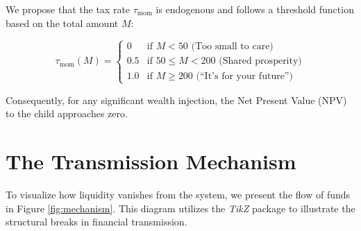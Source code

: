 \documentclass[AER]{AEA}
\begin{document}
We propose that the tax rate $\tau_{\text{mom}}$ is endogenous and follows a threshold function based on the total amount $M$:

\begin{equation}
    \tau_{\text{mom}}(M) = 
    \begin{cases} 
    0 & \text{if } M < 50 \text{ (Too small to care)} \\
    0.5 & \text{if } 50 \le M < 200 \text{ (Shared prosperity)} \\
    1.0 & \text{if } M \ge 200 \text{ (``It's for your future'')}
    \end{cases}
\end{equation}

Consequently, for any significant wealth injection, the Net Present Value (NPV) to the child approaches zero.

\section{The Transmission Mechanism}

To visualize how liquidity vanishes from the system, we present the flow of funds in Figure \ref{fig:mechanism}. This diagram utilizes the \textit{TikZ} package to illustrate the structural breaks in financial transmission.
\end{document}
